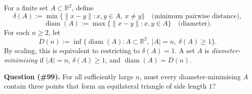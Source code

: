 For a finite set $A\subset\mathbb{R}^2$, define
\[
\delta(A):=\min\{\|x-y\|:x,y\in A,\ x\ne y\}\quad\text{(minimum pairwise distance)},
\]
\[
\operatorname{diam}(A):=\max\{\|x-y\|:x,y\in A\}\quad\text{(diameter)}.
\]
For each $n\ge 2$, let
\[
D(n):=\inf\{\operatorname{diam}(A): A\subset\mathbb{R}^2,\ |A|=n,\ \delta(A)\ge 1\}.
\]
By scaling, this is equivalent to restricting to $\delta(A)=1$.
A set $A$ is \emph{diameter-minimising} if $|A|=n$, $\delta(A)\ge 1$, and $\operatorname{diam}(A)=D(n)$.

\medskip
\noindent\textbf{Question (\#99).} For all sufficiently large $n$, must every diameter-minimising $A$ contain three points that form an equilateral triangle of side length $1$?

\item
